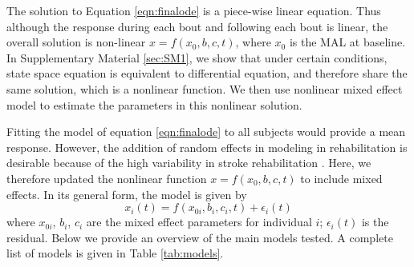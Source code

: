 The solution to Equation \ref{eqn:finalode} is a piece-wise linear equation. 
Thus although the response during each bout and following each bout is linear, the overall solution is non-linear
$ x = f(x_0,b,c,t) $, where $ x_0 $ is the MAL at baseline. 
In Supplementary Material \ref{sec:SM1}, we show that under certain conditions, state space equation is equivalent to differential equation, and therefore share the same solution, which is a nonlinear function. 
We then use nonlinear mixed effect model to estimate the parameters in this nonlinear solution.

Fitting the model of equation \ref{eqn:finalode} to all subjects would provide a mean response. 
However, the addition of random effects in modeling in rehabilitation is desirable because of the high variability in stroke rehabilitation \cite{Park2017}.
Here, we therefore updated the nonlinear function $ x=f(x_0,b,c,t) $ to include mixed effects. 
In its general form, the model is given by
\begin{equation}
	x_i(t) = f(x_{0i},b_i,c_i,t) + \epsilon_i (t)
\end{equation}
where $ x_{0i} $, $ b_i $, $ c_i $ are the mixed effect parameters for individual $ i $; $ \epsilon_i (t) $ is the residual. 
Below we provide an overview of the main models tested. 
A complete list of models is given in Table \ref{tab:models}.

